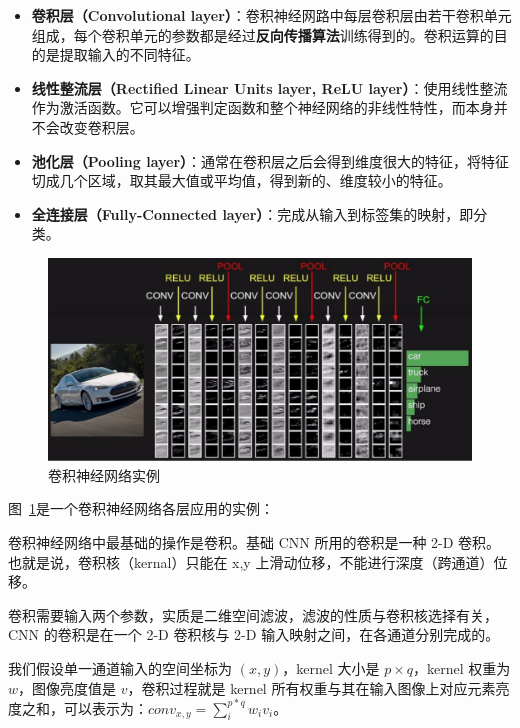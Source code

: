 \begin{itemize}
	\item \textbf{卷积层（Convolutional layer）}：卷积神经网路中每层卷积层由若干卷积单元组成，每个卷积单元的参数都是经过\textbf{反向传播算法}训练得到的。卷积运算的目的是提取输入的不同特征。
	\item \textbf{线性整流层（Rectified Linear Units layer, ReLU layer）}：使用线性整流作为激活函数。它可以增强判定函数和整个神经网络的非线性特性，而本身并不会改变卷积层。
	\item \textbf{池化层（Pooling layer）}：通常在卷积层之后会得到维度很大的特征，将特征切成几个区域，取其最大值或平均值，得到新的、维度较小的特征。
	\item \textbf{全连接层（Fully-Connected layer）}：完成从输入到标签集的映射，即分类。
\end{itemize}

\begin{figure}[h]
    \centering
    \includegraphics[width=\linewidth]{figures/cnn1}
    \caption{卷积神经网络实例}
    \label{fig:cnn1}
\end{figure}

图~\ref{fig:cnn1}是一个卷积神经网络各层应用的实例：


卷积神经网络中最基础的操作是卷积。基础 CNN 所用的卷积是一种 2-D 卷积。也就是说，卷积核（kernal）只能在 x,y 上滑动位移，不能进行深度（跨通道）位移。

卷积需要输入两个参数，实质是二维空间滤波，滤波的性质与卷积核选择有关，CNN 的卷积是在一个 2-D 卷积核与 2-D 输入映射之间，在各通道分别完成的。

我们假设单一通道输入的空间坐标为 ${\displaystyle (x,y)}$，kernel 大小是 ${\displaystyle p \times q}$，kernel 权重为 ${\displaystyle w}$，图像亮度值是 ${\displaystyle v}$，卷积过程就是 kernel 所有权重与其在输入图像上对应元素亮度之和，可以表示为：${\displaystyle conv_{x,y} = \sum_i^{p*q}w_i v_i}$。

